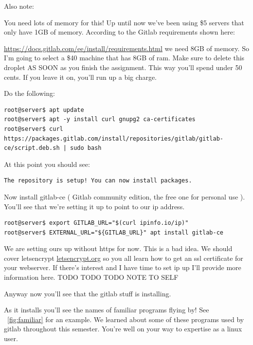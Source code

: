 \documentclass[10pt]{article}
\begin{document}
Also note:

You need lots of memory for this! Up until now we've been using \$5 servers that
only have 1GB of memory. According to the Gitlab requirements shown here:

\url{https://docs.gitlab.com/ee/install/requirements.html} we need 8GB of
memory. So I'm going to select a \$40 machine that has 8GB of ram. Make sure to
delete this droplet AS SOON as you finish the assignment. This way you'll spend
under 50 cents. If you leave it on, you'll run up a big charge.



Do the following:

\begin{lstlisting}
root@server$ apt update
root@server$ apt -y install curl gnupg2 ca-certificates
root@server$ curl https://packages.gitlab.com/install/repositories/gitlab/gitlab-ce/script.deb.sh | sudo bash
\end{lstlisting}

At this point you should see:

\begin{lstlisting}
The repository is setup! You can now install packages.
\end{lstlisting}

Now install gitlab-ce ( Gitlab community edition, the free one for personal use
). You'll see that we're setting it up to point to our ip address.


\begin{lstlisting}
root@server$ export GITLAB_URL="$(curl ipinfo.io/ip)"
root@server$ EXTERNAL_URL="${GITLAB_URL}" apt install gitlab-ce
\end{lstlisting}

We are setting ours up without https for now. This is a bad idea. We should
cover letsencrypt \url{letsencrypt.org} so you all learn how to get an ssl
certificate for your webserver. If there's interest and I have time to set ip up
I'll provide more information here. TODO TODO TODO NOTE TO SELF

Anyway now you'll see that the gitlab stuff is installing.

As it installs you'll see the names of familiar programs flying by! See
~\ref{fig:familiar} for an example. We learned about some of these programs used
by gitlab throughout this semester. You're well on your way to expertise as a
linux user.
\end{document}
